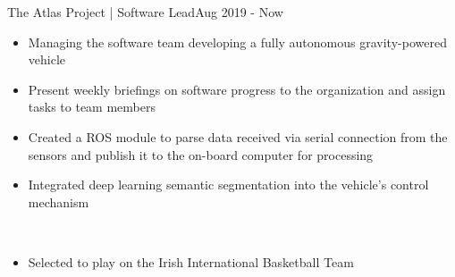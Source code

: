 
\begin{projects}

    \extracurricular
    {The Atlas Project | Software Lead}{Aug 2019 - Now}
    {
	    \begin{itemize}
    	    \item Managing the software team developing a fully autonomous gravity-powered vehicle
    	    \item Present weekly briefings on software progress to the organization and assign tasks to team members
    	    \item Created a ROS module to parse data received via serial connection from the sensors and publish it to the on-board computer for processing
    	    \item Integrated deep learning semantic segmentation into the vehicle's control mechanism
		\end{itemize}
    }
	\\

	\smallskip

    {
    \begin{itemize}
        \item Selected to play on the Irish International Basketball Team
    \end{itemize}
    }

\end{projects}
